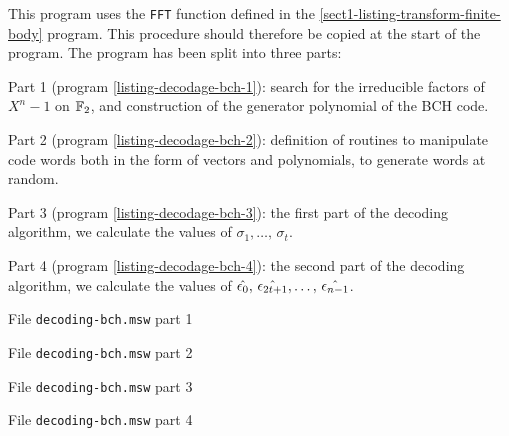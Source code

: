  
  This \Maple{} program uses the \texttt{FFT} function defined in the \ref{sect1-listing-transform-finite-body} program. This procedure should therefore be copied at the start of the program. The program has been split into three parts: \begin{rs}
\item Part 1 (program \ref{listing-decodage-bch-1}): search for the irreducible factors of $ X^n-1 $ on $ \mathbb{F}_2 $, and construction of the generator polynomial of the BCH code.
\item Part 2 (program \ref{listing-decodage-bch-2}): definition of routines to manipulate code words both in the form of vectors and polynomials, to generate words at random.
\item Part 3 (program \ref{listing-decodage-bch-3}): the first part of the decoding algorithm, we calculate the values of $ \sigma_1, \ldots, \, \sigma_t $.
\item Part 4 (program \ref{listing-decodage-bch-4}): the second part of the decoding algorithm, we calculate the values of $ \hat{\epsilon_0}, \, \hat{\epsilon_{2t + 1}}, \ldots, \, \hat{\epsilon_{n-1}} $.
\end{rs}
 
 
 
\begin{listing} \begin{footnotesize}

\end{footnotesize}
 
\caption{File \texttt{decoding-bch.msw} part 1}
 
\label{listing-decodage-bch-1}
\end{listing}
 
\begin{listing} \begin{footnotesize}

\end{footnotesize}
 
\caption{File \texttt{decoding-bch.msw} part 2}
 
\label{listing-decodage-bch-2}
\end{listing}
 
\begin{listing} \begin{footnotesize}

\end{footnotesize}
 
\caption{File \texttt{decoding-bch.msw} part 3}
 
\label{listing-decodage-bch-3}
\end{listing}
 
\begin{listing} \begin{footnotesize}

\end{footnotesize}
 
\caption{File \texttt{decoding-bch.msw} part 4}
 
\label{listing-decodage-bch-4}
\end{listing}

